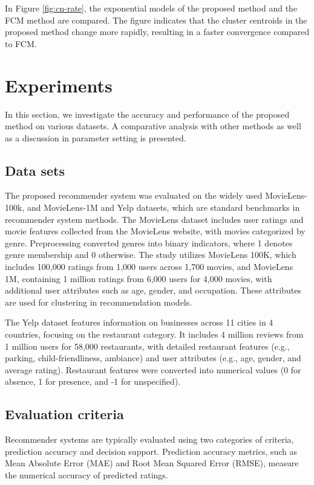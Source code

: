 \documentclass{article}
\begin{document}
In Figure \ref{fig:cn-rate}, the exponential models of the proposed method and the FCM method are compared. The figure indicates that the cluster centroids in the proposed method change more rapidly, resulting in a faster convergence compared to FCM.


\section{Experiments}
In this section, we investigate the accuracy and performance of the proposed method on various datasets. A comparative analysis with other methods as well as a discussion in parameter setting  is presented.

\subsection{Data sets}
The proposed recommender system was evaluated on the widely used MovieLens-100k, and MovieLens-1M and Yelp datasets, which are standard benchmarks in recommender system methods.
The MovieLens dataset includes user ratings and movie features collected from the MovieLens website, with movies categorized by genre. Preprocessing converted genres into binary indicators, where 1 denotes genre membership and 0 otherwise. The study utilizes MovieLens 100K, which includes 100,000 ratings from 1,000 users across 1,700 movies, and MovieLens 1M, containing 1 million ratings from 6,000 users for 4,000 movies, with additional user attributes such as age, gender, and occupation. These attributes are used for clustering in recommendation models.

The Yelp dataset features information on businesses across 11 cities in 4 countries, focusing on the restaurant category. It includes 4 million reviews from 1 million users for 58,000 restaurants, with detailed restaurant features (e.g., parking, child-friendliness, ambiance) and user attributes (e.g., age, gender, and average rating). Restaurant features were converted into numerical values (0 for absence, 1 for presence, and -1 for unspecified).

\subsection{Evaluation criteria}
Recommender systems are typically evaluated using two categories of criteria, prediction accuracy and decision support. Prediction accuracy metrics, such as Mean Absolute Error (MAE) and Root Mean Squared Error (RMSE), measure the numerical accuracy of predicted ratings. 
\end{document}

